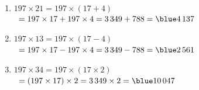    \ \\ [-5mm]
   \begin{enumerate}
      \item $197\times21 =197\times(17+4) $\\
         \quad\, $=197\times17+197\times4 =3\,349+788 =\blue 4\,137$
      \item $197\times13 =197\times(17-4)$ \\
         \quad\, $=197\times17-197\times4 =3\,349-788 =\blue 2\,561$
     \item $197\times34 =197\times(17\times2)$ \\
         \quad\, $=(197\times17)\times2 =3\,349\times2 =\blue 10\,047$
   \end{enumerate}
